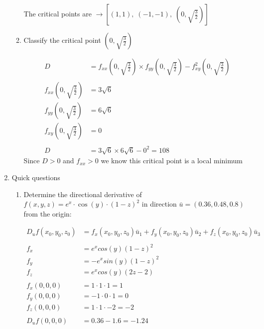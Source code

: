 \documentclass[a4paper,11pt]{article}
\begin{document}
\begin{preview}
\begin{enumerate}
\begin{enumerate}
            The critical points are $\rightarrow [(1,1), \; (-1,-1), \; (0, \sqrt{\frac{3}{2}})]$

        \item Classify the critical point $(0,\sqrt{\frac{3}{2}})$
        
        \begin{align*}
            D &= f_{xx}(0, \sqrt{\frac{3}{2}}) \times f_{yy}(0, \sqrt{\frac{3}{2}}) - f_{xy}^2 (0, \sqrt{\frac{3}{2}})\\\\
            f_{xx}(0, \sqrt{\frac{3}{2}}) &= 3\sqrt{6}\\
            f_{yy}(0, \sqrt{\frac{3}{2}}) &= 6\sqrt{6}\\
            f_{xy}(0, \sqrt{\frac{3}{2}}) &= 0\\\\
            D &= 3\sqrt{6} \times 6\sqrt{6} - 0^2 = 108
        \end{align*}
        Since $D  > 0$ and $f_{xx} > 0$ we know this critical point is a local minimum\\
    
    \end{enumerate}

    \item Quick questions
    
    \begin{enumerate}
        \item Determine the directional derivative of $f(x,y,z) = e^x \cdot \cos(y) \cdot (1-z)^2$ in direction $\bar{u} =  (0.36, 0.48, 0.8)$ from the origin:
        
        \begin{align*}
            D_u f(x_0,y_0,z_0) &= f_x(x_0,y_0,z_0)\bar{u}_1 + f_y(x_0,y_0,z_0)\bar{u}_2 + f_z(x_0,y_0,z_0)\bar{u}_3\\\\
            f_{x} &= e^{x}cos(y)(1-z)^{2} \\
            f_{y} &= -e^{x}sin(y)(1-z)^2 \\
            f_{z} &= e^{x}cos(y)(2z - 2)\\\\
            f_x(0,0,0) &= 1\cdot 1 \cdot1 = 1\\
            f_y(0,0,0) &= -1 \cdot 0 \cdot 1 = 0\\
            f_z(0,0,0) &= 1 \cdot 1 \cdot -2 = -2\\\\
            D_u f(0,0,0) &= 0.36 -1.6 = -1.24\\
        \end{align*}


\end{enumerate}
\end{enumerate}
\end{preview}
\end{document}
